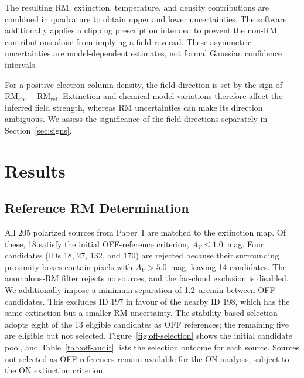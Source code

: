 \documentclass[twocolumn]{aastex701}
\begin{document}
  The resulting RM, extinction, temperature, and density contributions
  are combined in quadrature to obtain upper and lower uncertainties.
  The software additionally applies a clipping prescription intended to
  prevent the non-RM contributions alone from implying a field reversal.
  These asymmetric uncertainties are model-dependent estimates, not
  formal Gaussian confidence intervals.

  For a positive electron column density, the field direction is set by
  the sign of $\mathrm{RM_{obs}}-\mathrm{RM_{ref}}$. Extinction and
  chemical-model variations therefore affect the inferred field strength,
  whereas RM uncertainties can make its direction ambiguous. We assess
  the significance of the field directions separately in
  Section~\ref{sec:signs}.
\section{Results}
\label{sec:results}

\subsection{Reference RM Determination}
\label{sec:rmref}

All 205 polarized sources from Paper~I are matched to the extinction
  map. Of these, 18 satisfy the initial OFF-reference criterion,
  $A_V \leq 1.0$~mag. Four candidates (IDs 18, 27, 132, and 170) are
  rejected because their surrounding proximity boxes contain pixels
  with $A_V > 5.0$~mag, leaving 14 candidates. The anomalous-RM filter
  rejects no sources, and the far-cloud exclusion is disabled.
  We additionally impose a minimum separation of 1.2~arcmin between
  OFF candidates. This excludes ID 197 in favour of the nearby ID 198,
  which has the same extinction but a smaller RM uncertainty.
  The stability-based selection adopts eight of the 13 eligible
  candidates as OFF references; the remaining five are eligible but
  not selected. Figure~\ref{fig:off-selection} shows the initial
  candidate pool, and Table~\ref{tab:off-audit} lists the selection
  outcome for each source. Sources not selected as OFF references
  remain available for the ON analysis, subject to the ON extinction
  criterion.





\end{document}

